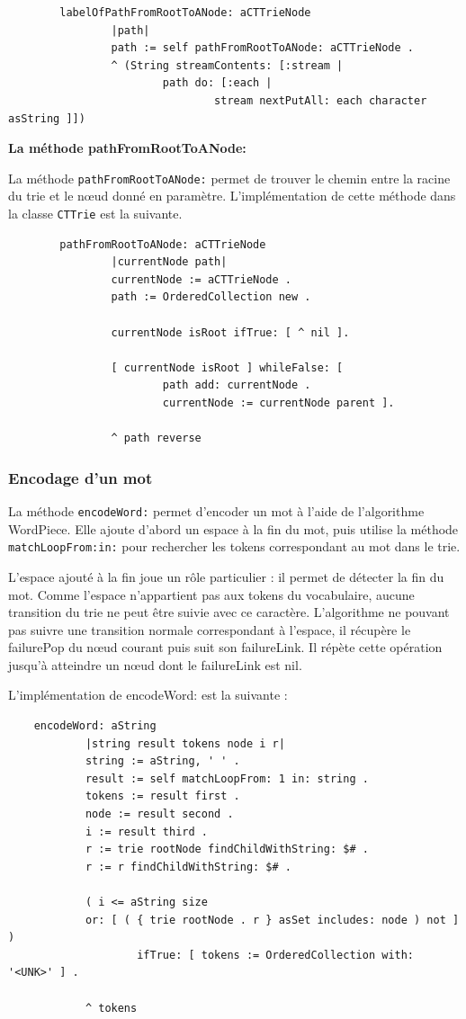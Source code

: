 \documentclass[12pt,a4paper]{report}
\begin{document}
	\begin{verbatim}
		labelOfPathFromRootToANode: aCTTrieNode
				|path|
				path := self pathFromRootToANode: aCTTrieNode .
				^ (String streamContents: [:stream |
						path do: [:each |
								stream nextPutAll: each character asString ]])
	\end{verbatim}
	
	\textbf{La méthode pathFromRootToANode:}
	
	La méthode \texttt{pathFromRootToANode:} permet de trouver le chemin entre la racine du trie et le nœud donné en paramètre. L'implémentation de cette méthode dans la classe \texttt{CTTrie} est la suivante.
	
	\begin{verbatim}
		pathFromRootToANode: aCTTrieNode
				|currentNode path|
				currentNode := aCTTrieNode .
				path := OrderedCollection new .
				
				currentNode isRoot ifTrue: [ ^ nil ].
				
				[ currentNode isRoot ] whileFalse: [
						path add: currentNode .
						currentNode := currentNode parent ].
						
				^ path reverse 
	\end{verbatim}
	
	\subsubsection{Encodage d'un mot}
	
	La méthode \texttt{encodeWord:} permet d'encoder un mot à l'aide de l'algorithme WordPiece. Elle ajoute d'abord un espace à la fin du mot, puis utilise la méthode \texttt{matchLoopFrom:in:} pour rechercher les tokens correspondant au mot dans le trie.
	
	L'espace ajouté à la fin joue un rôle particulier : il permet de détecter la fin du mot. Comme l'espace n'appartient pas aux tokens du vocabulaire, aucune transition du trie ne peut être suivie avec ce caractère. L'algorithme ne pouvant pas suivre une transition normale correspondant à l'espace, il récupère le failurePop du nœud courant puis suit son failureLink. Il répète cette opération jusqu'à atteindre un nœud dont le failureLink est nil.
	
	L'implémentation de encodeWord: est la suivante :
	
	\begin{verbatim}
	encodeWord: aString
			|string result tokens node i r|
			string := aString, ' ' .
			result := self matchLoopFrom: 1 in: string .
			tokens := result first .
			node := result second .
			i := result third .
			r := trie rootNode findChildWithString: $# .
			r := r findChildWithString: $# .
			
			( i <= aString size
			or: [ ( { trie rootNode . r } asSet includes: node ) not ] )
					ifTrue: [ tokens := OrderedCollection with: '<UNK>' ] .	
			
			^ tokens 	
	\end{verbatim}
	
\end{document}
